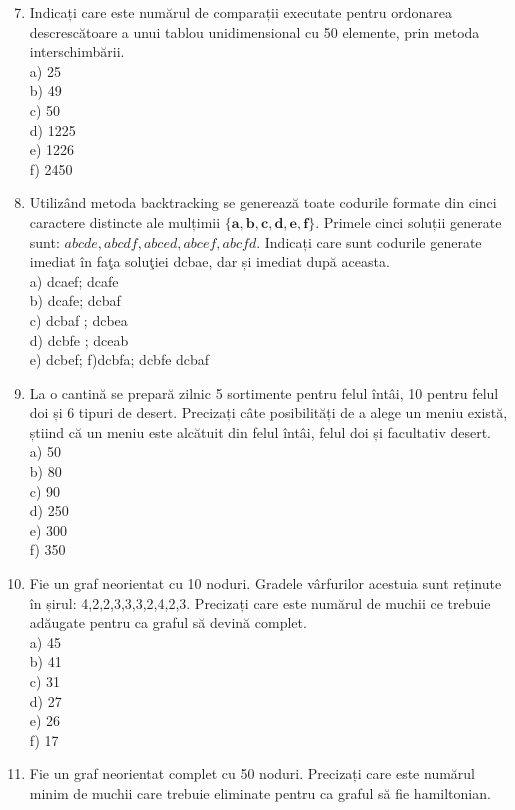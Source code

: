 \begin{enumerate}
  \setcounter{enumi}{6}
  \item Indicați care este numărul de comparații executate pentru ordonarea descrescătoare a unui tablou unidimensional cu 50 elemente, prin metoda interschimbării.\\
a) 25\\
b) 49\\
c) 50\\
d) 1225\\
e) 1226\\
f) 2450
  \item Utilizând metoda backtracking se generează toate codurile formate din cinci caractere distincte ale mulțimii $\{\mathbf{a}, \mathbf{b}, \mathbf{c}, \mathbf{d}, \mathbf{e}, \mathbf{f}\}$. Primele cinci soluții generate sunt: $a b c d e, a b c d f, a b c e d, a b c e f, a b c f d$. Indicați care sunt codurile generate imediat în faţa soluţiei dcbae, dar și imediat după aceasta.\\
a) dcaef; dcafe\\
b) dcafe; dcbaf\\
c) dcbaf ; dcbea\\
d) dcbfe ; dceab\\
e) dcbef; f)dcbfa; dcbfe dcbaf
  \item La o cantină se prepară zilnic 5 sortimente pentru felul întâi, 10 pentru felul doi și 6 tipuri de desert. Precizați câte posibilități de a alege un meniu există, știind că un meniu este alcătuit din felul întâi, felul doi și facultativ desert.\\
a) 50\\
b) 80\\
c) 90\\
d) 250\\
e) 300\\
f) 350
  \item Fie un graf neorientat cu 10 noduri. Gradele vârfurilor acestuia sunt reținute în șirul: 4,2,2,3,3,3,2,4,2,3. Precizați care este numărul de muchii ce trebuie adăugate pentru ca graful să devină complet.\\
a) 45\\
b) 41\\
c) 31\\
d) 27\\
e) 26\\
f) 17
  \item Fie un graf neorientat complet cu 50 noduri. Precizați care este numărul minim de muchii care trebuie eliminate pentru ca graful să fie hamiltonian.\\

\end{enumerate}
